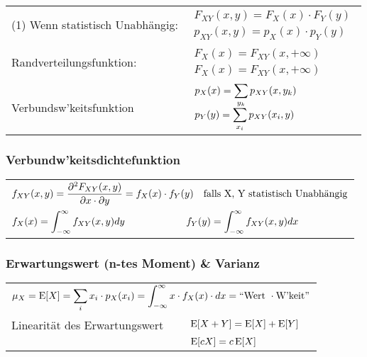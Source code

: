 \documentclass[a4paper]{article}
\begin{document}
\begin{twocolumn}
\begin{tabularx}{\columnwidth}{ZX}
  (1) Wenn statistisch Unabhängig: & $\begin{array}{l} F_{XY}(x,y) = F_X(x) \cdot F_Y(y)
  \\
  p_{XY}(x,y) = p_X(x) \cdot p_Y(y)  \end{array}$ \\
  Randverteilungsfunktion: & $\begin{array}{l} F_X(x) = F_{XY}(x, +\infty) \\ F_X(x) =
  F_{XY}(x, +\infty) \end{array}$ \\
  Verbundsw'keitsfunktion & $\begin{array}{l} \displaystyle p_X(x) = \sum_{y_k} p_{XY}(x,y_k) \\
  \displaystyle p_Y(y) = \sum_{x_i} p_{XY}(x_i,y) \end{array}$ \\
\end{tabularx}

\subsubsection{Verbundw'keitsdichtefunktion}
\begin{tabularx}{\columnwidth}{YY}
  \\
  $\displaystyle f_X(x) = \int_{-\infty}^{\infty}f_{XY}(x,y) dy$ &
  $\displaystyle f_Y(y) = \int_{-\infty}^{\infty}f_{XY}(x,y) dx$ \\
\end{tabularx}

\subsubsection{Erwartungswert (n-tes Moment) \& Varianz}
\begin{tabular}{ll}
  \multicolumn{2}{l}{$\displaystyle \mu_X = \operatorname{E}[X] = \sum_{i} x_i \cdot p_X(x_i) =
  \int_{-\infty}^\infty x \cdot f_X(x) \cdot dx = ``\text{Wert } \cdot \text{W'keit}"$}\\
  Linearität des Erwartungswert & 
  $\operatorname{E}[X+Y] = \operatorname{E}[X] + \operatorname{E}[Y] $ \\
  & $\operatorname{E}[cX] = c\operatorname{E}[X]$ \\
\end{tabular}


\end{twocolumn}
\end{document}

